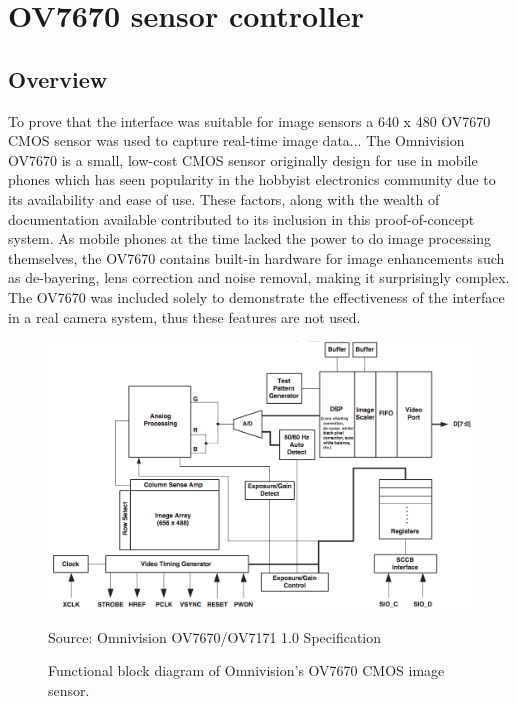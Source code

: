 \section{OV7670 sensor controller}
\subsection{Overview}
To prove that the interface was suitable for image sensors a 640 x 480 OV7670 CMOS sensor was used to capture real-time image data... The Omnivision OV7670 is a small, low-cost CMOS sensor originally design for use in mobile phones which has seen popularity in the hobbyist electronics community due to its availability and ease of use. These factors, along with the wealth of documentation available contributed to its inclusion in this proof-of-concept system. As mobile phones at the time lacked the power to do image processing themselves, the OV7670 contains built-in hardware for image enhancements such as de-bayering, lens correction and noise removal, making it surprisingly complex. The OV7670 was included solely to demonstrate the effectiveness of the interface in a real camera system, thus these features are not used.

\begin{figure}
  \centering
  \includegraphics[width=1\textwidth]{./img/ov7670_block_diagram.png}\par
Source: Omnivision OV7670/OV7171 1.0 Specification
  \caption{Functional block diagram of Omnivision's OV7670 CMOS image sensor.}
  \label{fig:ov7670_block_diagram}
\end{figure}

